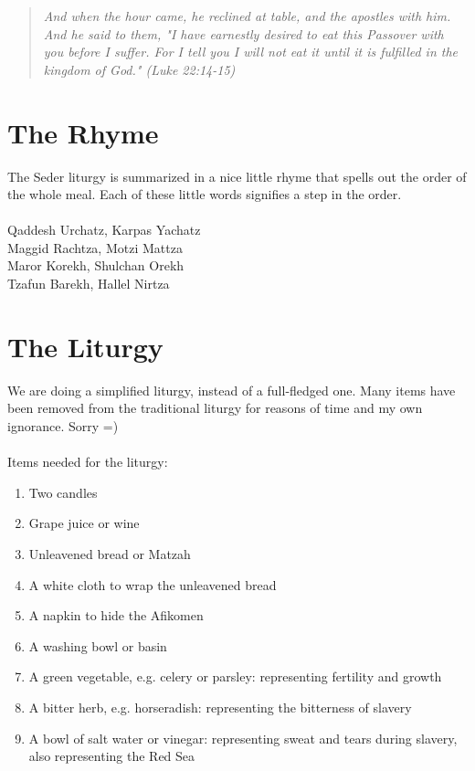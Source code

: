 \documentclass[10pt,oneside,footinclude=true,headinclude=true]{scrbook} %
\newcommand\quot[1]{
	\begin{quote}\textit{\small#1}\end{quote}
}
\begin{document}
\quot{And when the hour came, he reclined at table, and the apostles with him. And he said to them, "I have earnestly desired to eat this Passover with you before I suffer. For I tell you I will not eat it until it is fulfilled in the kingdom of God." (Luke 22:14-15)}


\section{The Rhyme}

The Seder liturgy is summarized in a nice little rhyme that spells out the order of the whole meal. Each of these little words signifies a step in the order.\\
\\
Qaddesh Urchatz, Karpas Yachatz\\
Maggid Rachtza, Motzi Mattza\\
Maror Korekh, Shulchan Orekh\\
Tzafun Barekh, Hallel Nirtza


\section{The Liturgy}

We are doing a simplified liturgy, instead of a full-fledged one. Many items have been removed from the traditional liturgy for reasons of time and my own ignorance. Sorry =)\\
\\
Items needed for the liturgy:
\begin{enumerate}
	\item{Two candles}
	\item{Grape juice or wine}
	\item{Unleavened bread or Matzah}
	\item{A white cloth to wrap the unleavened bread}
	\item{A napkin to hide the Afikomen}
	\item{A washing bowl or basin}
	\item{A green vegetable, e.g. celery or parsley: representing fertility and growth}
	\item{A bitter herb, e.g. horseradish: representing the bitterness of slavery}
	\item{A bowl of salt water or vinegar: representing sweat and tears during slavery, also representing the Red Sea}
\end{enumerate}

\vspace{5mm}
\end{document}
